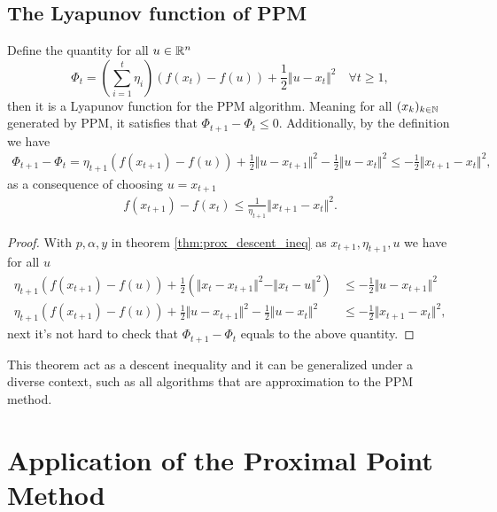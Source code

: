 \documentclass[12pt]{article}
\begin{document}
    \subsection{The Lyapunov function of PPM}
        \begin{theorem}
            Define the quantity for all $u \in \mathbb R^n$
            $$
                \Phi_t = 
                \left(
                    \sum_{i = 1}^{t} \eta_i
                \right)(f(x_t) - f(u)) + \frac{1}{2} \Vert u - x_t\Vert^2 \quad \forall t \ge 1, 
            $$
            then it is a Lyapunov function for the PPM algorithm. 
            Meaning for all $(x_k)_{k \in \mathbb N}$ generated by PPM, it satisfies that $\Phi_{t + 1} - \Phi_t \le 0$. 
            Additionally, by the definition we have 
            \begin{align*}
                \Phi_{t + 1} - \Phi_{t} = 
                \eta_{t + 1}(f(x_{t + 1}) - f(u)) 
                + 
                \frac{1}{2}\Vert u - x_{t + 1}\Vert^2 
                -
                \frac{1}{2}\Vert u - x_t\Vert^2 
                \le 
                - \frac{1}{2}\Vert x_{t + 1} - x_t\Vert^2, 
            \end{align*}
            as a consequence of choosing $u = x_{t + 1}$
            \begin{align*}
                f(x_{t + 1}) - f(x_t) \le \frac{1}{\eta_{t + 1}}\Vert x_{t + 1} - x_t\Vert^2. 
            \end{align*}
        \end{theorem}
        \begin{proof}
            With $p, \alpha, y$ in theorem \ref*{thm:prox_descent_ineq} as $x_{t + 1}, \eta_{t + 1}, u$ we have for all $u$
            \begin{align*}
                \eta_{t + 1} (f(x_{t + 1}) - f(u)) + 
                \frac{1}{2}(
                    \Vert x_t - x_{t + 1} \Vert^2 
                    - 
                    \Vert x_t - u\Vert^2
                ) &\le 
                - \frac{1}{2}\Vert u - x_{t + 1}\Vert^2
                \\
                \eta_{t + 1}(f(x_{t + 1}) - f(u)) 
                + 
                \frac{1}{2}\Vert u - x_{t + 1}\Vert^2 
                -
                \frac{1}{2}\Vert u - x_t\Vert^2 
                & \le 
                - \frac{1}{2}\Vert x_{t + 1} - x_t\Vert^2, 
            \end{align*}
            next it's not hard to check that $\Phi_{t + 1} - \Phi_t$ equals to the above quantity. 
        \end{proof}
        \begin{remark}
            This theorem act as a descent inequality and it can be generalized under a diverse context, such as all algorithms that are approximation to the PPM method. 
        \end{remark}
    

\section{Application of the Proximal Point Method}




\end{document}
